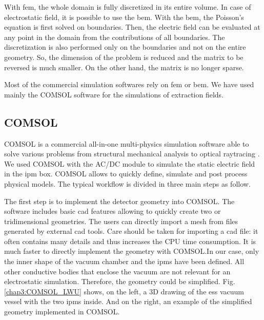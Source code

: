 \begin{refsection}
  With \acrshort{fem}, the whole domain is fully discretized in its entire volume. In case of electrostatic field, it is possible to use the \acrfull{bem}. With the \acrshort{bem}, the Poisson’s equation is first solved on boundaries. Then, the electric field can be evaluated at any point in the domain from the contributions of all boundaries. The discretization is also performed only on the boundaries and not on the entire geometry. So, the dimension of the problem is reduced and the matrix to be reversed is much smaller. On the other hand, the matrix is no longer sparse.

  Most of the commercial simulation softwares \cite{cststudio2018,ansys2018,couloumb2018} rely on \acrshort{fem} or \acrshort{bem}. We have used mainly the COMSOL software for the simulations of extraction fields.

  \subsection{COMSOL}
  COMSOL is a commercial all-in-one multi-physics simulation software able to solve various problems from structural mechanical analysis to optical raytracing \cite{comsol2018}. We used COMSOL with the AC/DC module \cite{comsolacdc2018} to simulate the static electric field in the \acrshort{ipm} box. COMSOL allows to quickly define, simulate and post process physical models. The typical workflow is divided in three main steps as follow.
  

  The first step is to implement the detector geometry into COMSOL. The software includes basic \acrshort{cad} features allowing to quickly create two or tridimensional geometries. The users can directly import a mesh from files generated by external \acrshort{cad} tools. Care should be taken for importing a \acrshort{cad} file: it often contains many details and thus increases the CPU time consumption. It is much faster to directly implement the geometry with COMSOL.In our case, only the inner shape of the vacuum chamber and the \acrshort{ipm}s have been defined. All other conductive bodies that enclose the vacuum are not relevant for an electrostatic simulation. Therefore, the geometry could be simplified. Fig. \ref{chap3:COMSOL_LWU} shows, on the left, a 3D drawing of the \acrshort{ess} vacuum vessel with the two \acrshort{ipm}s inside. And on the right, an example of the simplified geometry implemented in COMSOL.
  


\end{refsection}
